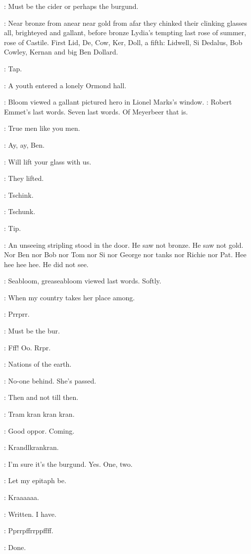 \BloomInt:
Must be the cider or perhaps the burgund.

:
Near bronze from anear near gold from afar they chinked their clinking
glasses all, brighteyed and gallant,
before bronze Lydia's tempting
last rose of summer, rose of Castile. First Lid, De, Cow, Ker, Doll, a
fifth: Lidwell, Si Dedalus, Bob Cowley, Kernan and big Ben Dollard.

\stripling:
Tap.

:
A youth entered a lonely Ormond hall.

:
Bloom viewed a gallant pictured hero in Lionel Marks's window.
\BloomInt:
Robert Emmet's last words. Seven last words.
Of Meyerbeer that is.

\dollard:
True men like you men.

\simon:
Ay, ay, Ben.

\dollard:
Will lift your glass with us.

:
They lifted.


:
Tschink.

:
Tschunk.

\stripling:
Tip.

:
An unseeing stripling stood in the door. He saw not bronze. He
saw not gold. Nor Ben nor Bob nor Tom nor Si nor George nor tanks nor
Richie nor Pat. Hee hee hee hee. He did not see.

:
Seabloom, greaseabloom viewed last words. Softly.

\emmet:
When my country takes her place among.

:
Prrprr.

\BloomInt:
Must be the bur.

:
Fff! Oo. Rrpr.

\emmet:
Nations of the earth.

\BloomInt:
No-one behind. She's passed.

\emmet:
Then and not till then.

:
Tram kran kran kran.

\BloomInt:
Good oppor.
Coming.

:
Krandlkrankran.

\BloomInt:
I'm sure it's the burgund.
Yes.
One, two.

\emmet:
Let my epitaph be.

:
Kraaaaaa.

\emmet:
Written.
I have.

:
Pprrpffrrppffff.

\emmet:
Done.
